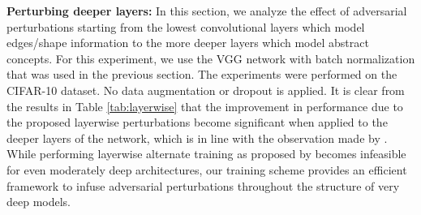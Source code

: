 \textbf{Perturbing deeper layers:} In this section, we analyze the effect of adversarial perturbations starting from the lowest convolutional layers which model edges/shape information to the more deeper layers which model abstract concepts. For this experiment, we use the VGG network with batch normalization that was used in the previous section. The experiments were performed on the CIFAR-10 dataset. No data augmentation or dropout is applied. It is clear from the results in Table \ref{tab:layerwise} that the improvement in performance due to the proposed layerwise perturbations become significant when applied to the deeper layers of the network, which is in line with the observation made by \cite{szegedy2013intriguing}. While performing layerwise alternate training as proposed by\cite{szegedy2013intriguing}  becomes infeasible for even moderately deep architectures, our training scheme provides an efficient framework to infuse adversarial perturbations throughout the structure of very deep models. 


